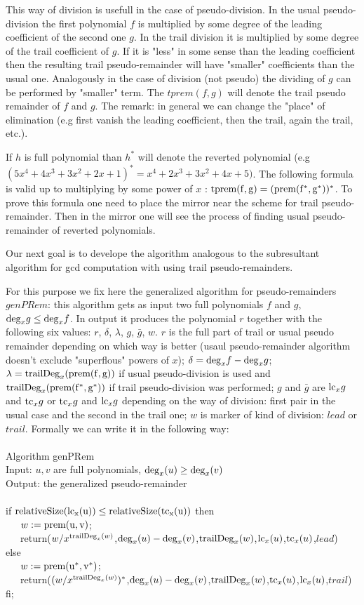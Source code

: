 \documentclass[12pt,fullpage]{article}
\newcommand{\dg}{{\rm deg}_x}
\newcommand{\tdg}{{\rm trailDeg}_x}
\newcommand{\lc}{{\rm lc}_x}
\newcommand{\tc}{{\rm tc}_x}
\newcommand{\prem}{\rm prem}
\newcommand{\tprem}{\rm tprem}
\newcommand{\relativeSize}{\rm relativeSize}
\begin{document}
This way of division is usefull in the case of pseudo-division.
In the usual pseudo-division the first polynomial $f$ is multiplied by some degree of the
leading
coefficient of the second one $g$.
In the trail division it is multiplied by some degree
of the trail coefficient of $g$.
If it is "less" in some sense than the leading coefficient
then the resulting trail pseudo-remainder will have "smaller" 
coefficients than the
usual one. 
Analogously in the case of division (not pseudo) the dividing of $g$ can be
performed by "smaller" term.
The $tprem(f,g)$ will denote the trail pseudo remainder of $f$ and $g$.
The remark: in general we can change the "place" of elimination (e.g first
vanish the leading coefficient, then the trail, again the trail, etc.).

If $h$ is full polynomial than $h^*$ will denote the reverted polynomial (e.g
$(5x^4+4x^3+3x^2+2x+1)^*=x^4+2x^3+3x^2+4x+5)$.
The following formula is valid up to multiplying by some power of $x$ :
$\tprem(f,g)=(\prem(f^*,g^*))^*$.
 To prove this formula one need to 
place the mirror near the scheme for trail pseudo-remainder. Then in the mirror
one will see the process of finding usual pseudo-remainder of reverted polynomials.

Our next goal is to develope the algorithm analogous to the subresultant algorithm
 for gcd computation \cite{Knuth} with using trail pseudo-remainders.

For this purpose we fix here the generalized algorithm for pseudo-remainders
$genPRem$: this algorithm gets as input two full polynomials $f$ and $g$,
$\dg g \le \dg f$.
In output it produces the polynomial $r$ together with the following six values:
$r$, $\delta$, $\lambda$, $g$, $\bar g$, $w$.
$r$ is the full part of trail or usual pseudo remainder depending on which way
is better
(usaul pseudo-remainder
algorithm doesn't exclude "superflous" powers of $x$); $\delta=\dg f-\dg g$;
$\lambda=\tdg(\prem(f,g))$ 
if usual pseudo-division is used and
$\tdg(\prem(f^*,g^*))$ if trail pseudo-division was performed;
$g$ and $\bar g$ are  $\lc g$ and $\tc g$ or $\tc g$ and $\lc g$ depending 
on the way of division: first pair in the usual case and the second in the trail
one; $w$ is marker of kind of division: $lead$ or $trail$.
Formally we can write it in the following way:\\
~\\
Algorithm genPRem\\
Input: $u,v$ are full polynomials, $\dg(u)\ge\dg(v)$\\ 
Output: the generalized pseudo-remainder\\
~\\
\medskip
if $\relativeSize(\lc(u))\le\relativeSize(\tc(u))$ then\\
\hbox{~~~}$w:=\prem(u,v)$;\\
\hbox{~~~}return($w/x^{\tdg(w)}$,$\dg(u)-\dg(v)$,$\tdg(w)$,$\lc(u)$,$\tc(u)$,$lead$)\\
else\\
\hbox{~~~}$w:=\prem(u^*,v^*)$;\\
\hbox{~~~}return($(w/x^{\tdg(w)})^*$,$\dg(u)-\dg(v)$,$\tdg(w)$,$\tc(u)$,$\lc(u)$,$trail$)\\
fi;\\
\end{document}
